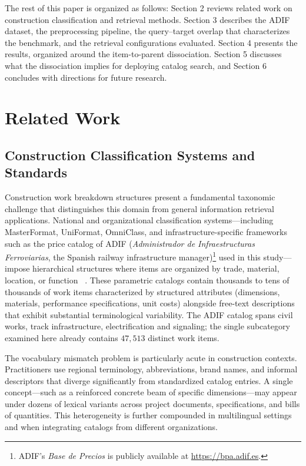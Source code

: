 \documentclass[preprint,review,12pt]{elsarticle}
\begin{document}
The rest of this paper is organized as follows: Section 2 reviews related work on construction classification and retrieval methods. Section 3 describes the ADIF dataset, the preprocessing pipeline, the query--target overlap that characterizes the benchmark, and the retrieval configurations evaluated. Section 4 presents the results, organized around the item-to-parent dissociation. Section 5 discusses what the dissociation implies for deploying catalog search, and Section 6 concludes with directions for future research.

\section{Related Work}

\subsection{Construction Classification Systems and Standards}

Construction work breakdown structures present a fundamental taxonomic challenge that distinguishes this domain from general information retrieval applications. National and organizational classification systems—including MasterFormat, UniFormat, OmniClass, and infrastructure-specific frameworks such as the price catalog of ADIF (\textit{Administrador de Infraestructuras Ferroviarias}, the Spanish railway infrastructure manager)\footnote{ADIF's \textit{Base de Precios} is publicly available at \url{https://bpa.adif.es}.} used in this study—impose hierarchical structures where items are organized by trade, material, location, or function ~\cite{royanoAnalysisClassificationSystems2023a, guvenConstructionClassificationSystem2022}. These parametric catalogs contain thousands to tens of thousands of work items characterized by structured attributes (dimensions, materials, performance specifications, unit costs) alongside free-text descriptions that exhibit substantial terminological variability. The ADIF catalog spans civil works, track infrastructure, electrification and signaling; the single subcategory examined here already contains $47{,}513$ distinct work items.

The vocabulary mismatch problem is particularly acute in construction contexts. Practitioners use regional terminology, abbreviations, brand names, and informal descriptors that diverge significantly from standardized catalog entries. A single concept—such as a reinforced concrete beam of specific dimensions—may appear under dozens of lexical variants across project documents, specifications, and bills of quantities. This heterogeneity is further compounded in multilingual settings and when integrating catalogs from different organizations. 
\end{document}
